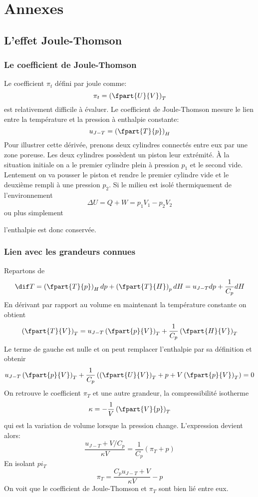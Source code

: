 \section{Annexes}
\subsection{L'effet Joule-Thomson}
\subsubsection{Le coefficient de Joule-Thomson}
Le coefficient $\pi_t$ défini par joule comme:
\[ \pi_t = \left(\fpart{U}{V}\right)_T \]
est relativement difficile à évaluer.
Le coefficient de Joule-Thomson mesure le lien entre la température et
la pression à enthalpie constante:
\[  u_{J-T} = \left(\fpart{T}{p}\right)_H \]
Pour illustrer cette dérivée, prenons deux cylindres connectés
entre eux par une zone poreuse.
Les deux cylindres possèdent un piston leur extrémité.
À la situation initiale on a le premier cylindre plein
à pression $p_1$ et le second vide.
Lentement on va pousser le piston et rendre le premier cylindre vide
et le deuxième rempli à une pression $p_2$.
Si le milieu est isolé thermiquement de l'environnement
\[ \Delta U = Q+ W = p_1V_1-p_2V_2 \]
ou plus simplement

l'enthalpie est donc conservée.
\subsubsection{Lien avec les grandeurs connues}
Repartons de
\[ \dif T = \left ( \fpart{T}{p}\right)_H dp+
\left ( \fpart{T}{H}\right)_p dH = u_{J-T}dp+\frac 1{C_p}dH \]
En dérivant par rapport au volume en maintenant
la température constante on obtient
\[ \left ( \fpart{T}{V} \right)_T =
  u_{J-T}\left(\fpart{p}{V}\right)_T+
  \frac 1{C_p}\left(\fpart{H}{V}\right)_T \]
Le terme de gauche est nulle et on peut remplacer
l'enthalpie par sa définition et obtenir
\[ u_{J-T}\left(\fpart{p}{V}\right)_T+
  \frac 1{C_p} \left( \left(\fpart{U}{V}\right)_T+p+
  V\left(\fpart{p}{V}\right)_T\right) = 0 \]
On retrouve le coefficient $\pi_T$ et une autre grandeur,
la compressibilité isotherme
\[  \kappa = - \frac 1V \left(\fpart{V}{p}\right)_T \]
qui est la variation de volume lorsque la pression change.
L'expression devient alors:
\[ \frac{u_{J-T}+V/C_p}{\kappa V} = \frac 1{C_p}(\pi_T+p) \]
En isolant $pi_T$
\[  \pi_T = \frac {C_p u_{J-T}+V}{\kappa V}-p \]
On voit que le coefficient de Joule-Thomson et $\pi_T$ sont bien lié entre eux.

